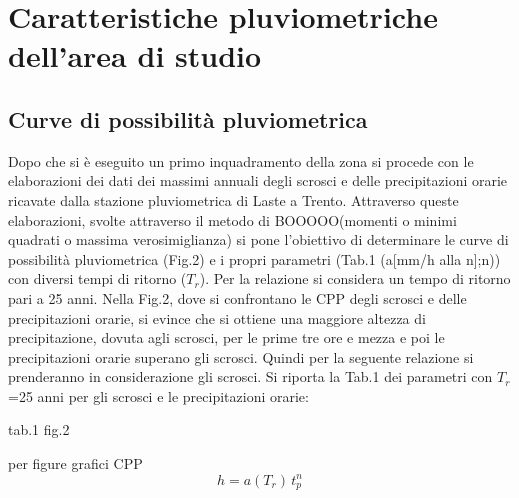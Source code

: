 \chapter{Caratteristiche pluviometriche dell’area di studio}\label{cap:pluviometriche}
\section{Curve di possibilità pluviometrica}
Dopo che si è eseguito un primo inquadramento della zona si procede con le elaborazioni dei dati dei massimi annuali degli scrosci e delle precipitazioni orarie ricavate dalla stazione pluviometrica di Laste a Trento.
Attraverso queste elaborazioni, svolte attraverso il metodo di BOOOOO(momenti o minimi quadrati o massima verosimiglianza) si pone l'obiettivo di determinare le curve di possibilità pluviometrica (Fig.2) e i propri parametri (Tab.1 (a[mm/h alla n];n)) con diversi tempi di ritorno ($T_r$). 
Per la relazione si considera un tempo di ritorno pari a \si{25} anni. Nella Fig.2, dove si confrontano le CPP degli scrosci e delle precipitazioni orarie, si evince che si ottiene una maggiore altezza di precipitazione, dovuta agli scrosci, per le prime tre ore e mezza e poi le precipitazioni orarie superano gli scrosci. 
Quindi per la seguente relazione si prenderanno in considerazione gli scrosci. 
Si riporta la Tab.1 dei parametri con $T_r$=\si{25} anni per gli scrosci e le precipitazioni orarie:

tab.1 fig.2

per figure grafici CPP 
\begin{equation}
    \label{eq:CPP}
    h = a(T_r) \, t_p ^{n}
\end{equation}

